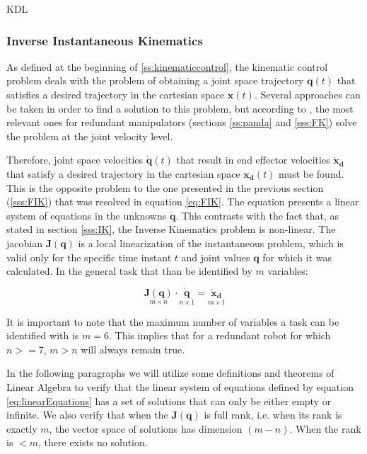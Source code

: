 KDL

\subsubsection{Inverse Instantaneous Kinematics}
\label{sss:IIK}
As defined at the beginning of \ref{ss:kinematiccontrol}, the kinematic control problem deals with the problem of obtaining a joint space trajectory $\mathbf{q}(t)$ that satisfies a desired trajectory in the cartesian space $\mathbf{x}(t)$. Several approaches can be taken in order to find a solution to this problem, but according to \cite{siciliano1990kinematic}, the most relevant ones for redundant manipulators (sections \ref{ss:panda} and \ref{sss:FK}) solve the problem at the joint velocity level.

Therefore, joint space velocities $\mathbf{\dot{q}}(t)$ that result in end effector velocities $\mathbf{\dot{x}_{d}}$ that satisfy a desired trajectory in the cartesian space $\mathbf{x_{d}}(t)$ must be found. This is the opposite problem to the one presented in the previous section (\ref{sss:FIK}) that was resolved in equation \ref{eq:FIK}. The equation presents a linear system of equations in the unknowns ${\mathbf{\dot{q}}}$. This contrasts with the fact that, as stated in section \ref{sss:IK}, the Inverse Kinematics problem is non-linear. The jacobian ${\mathbf{J}(\mathbf{{q}})}$ is a local linearization of the instantaneous problem, which is valid only for the specific time instant $t$ and joint values $\mathbf{{q}}$ for which it was calculated. In the general task that than be identified by $m$ variables:

\begin{equation}
    \label{eq:linearEquations}
    \underset{m\times n}{\mathbf{J}(\mathbf{{q}})} \cdot  \underset{n\times 1}{\mathbf{\dot{q}}} = \underset{m\times 1}{\mathbf{\dot{x}_{d}}}
\end{equation}

It is important to note that the maximum number of variables a task can be identified with is $m = 6$. This implies that for a redundant robot for which $n >= 7$, $m > n$ will always remain true.

In the following paragraphs we will utilize some definitions and theorems of Linear Algebra to verify that the linear system of equations defined by equation \ref{eq:linearEquations} has a set of solutions that can only be either empty or infinite. We also verify that when the ${\mathbf{J}(\mathbf{{q}})}$ is full rank, i.e. when its rank is exactly $m$, the vector space of solutions has dimension $(m-n)$. When the rank is $<m$, there exists no solution.

